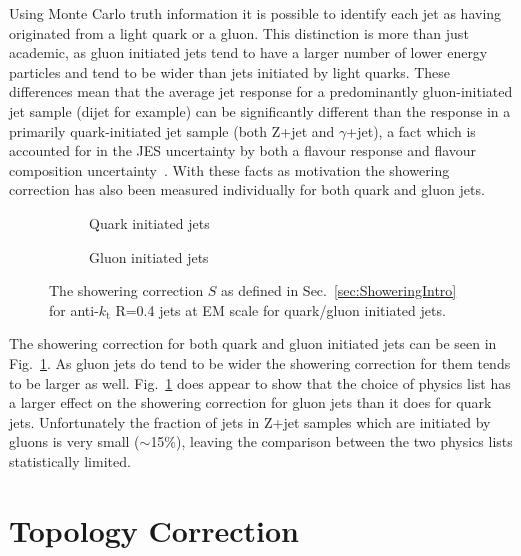 Using Monte Carlo truth information it is possible to identify each jet as having originated from a light quark or a gluon.  
This distinction is more than just academic, as gluon initiated jets tend to have a larger number of lower energy particles and tend to be wider than jets initiated by light quarks.  
These differences mean that the average jet response for a predominantly gluon-initiated jet sample (dijet for example) can be significantly different than the response in a primarily quark-initiated jet sample (both Z+jet and $\gamma$+jet), a fact which is accounted for in the JES uncertainty by both a flavour response and flavour composition uncertainty~\cite{Aaboud:2017jcu}.  
With these facts as motivation the showering correction has also been measured individually for both quark and gluon jets.  

\begin{figure}[!ht]
  \centering
  \begin{subfigure}{.5\textwidth}
    \centering
    \caption{Quark initiated jets}
  \end{subfigure}%
  \begin{subfigure}{.5\textwidth}  \centering
    \caption{Gluon initiated jets}
  \end{subfigure}
  \caption[Showering correction for quark/gluon initiated jets.]
{\small The showering correction $S$ as defined in Sec.~\ref{sec:ShoweringIntro} for anti-$k_\mathrm{t}$ R=0.4 jets at EM scale for quark/gluon initiated jets.  }
  \label{Fig:Showering_QG4}
\end{figure} 

The showering correction for both quark and gluon initiated jets can be seen in Fig.~\ref{Fig:Showering_QG4}.  
As gluon jets do tend to be wider the showering correction for them tends to be larger as well.  
Fig.~\ref{Fig:Showering_QG4} does appear to show that the choice of physics list has a larger effect on the showering correction for gluon jets than it does for quark jets.  
Unfortunately the fraction of jets in Z+jet samples which are initiated by gluons is very small ($\sim$15\%), leaving the comparison between the two physics lists statistically limited.   


\section{Topology Correction}


